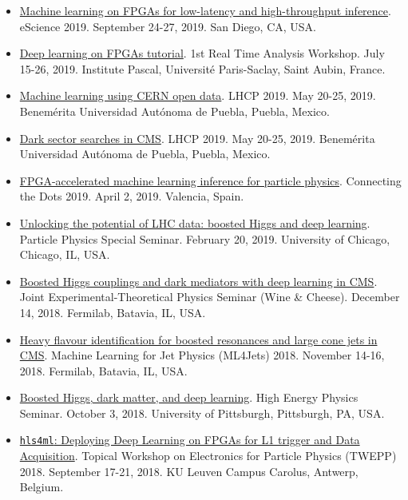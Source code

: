 \documentclass[11pt]{res}
\begin{document}
\begin{resume}
\begin{itemize}
    \item \href{https://escience2019.sdsc.edu/program}{Machine learning on FPGAs for low-latency and high-throughput inference}. eScience 2019. September 24-27, 2019. San Diego, CA, USA.
    \item \href{https://indico.cern.ch/event/793125/contributions/3495251/}{Deep learning on FPGAs tutorial}. 1st Real Time Analysis Workshop. July 15-26, 2019. Institute Pascal, Universit\'{e} Paris-Saclay, Saint Aubin, France.
    \item \href{https://indico.cern.ch/event/687651/contributions/3428206/}{Machine learning using CERN open data}. LHCP 2019. May 20-25, 2019. Benem\'{e}rita Universidad Aut\'{o}noma de Puebla, Puebla, Mexico.
    \item \href{https://indico.cern.ch/event/687651/contributions/3426898/}{Dark sector searches in CMS}. LHCP 2019. May 20-25, 2019. Benem\'{e}rita Universidad Aut\'{o}noma de Puebla, Puebla, Mexico.
    \item \href{https://indico.cern.ch/event/742793/contributions/3274392/}{FPGA-accelerated machine learning inference for particle physics}. Connecting the Dots 2019. April 2, 2019. Valencia, Spain.
    \item \href{https://universityofchicago.hosted.panopto.com/Panopto/Pages/Viewer.aspx?id=66ca09d7-74c1-4b12-bb57-a9fa01046cdf}{Unlocking the potential of LHC data: boosted Higgs and deep learning}. Particle Physics Special Seminar. February 20, 2019. University of Chicago, Chicago, IL, USA.
    \item \href{http://theory.fnal.gov/events/event/results-from-cms-18/}{Boosted Higgs couplings and dark mediators with deep learning in CMS}. Joint Experimental-Theoretical Physics Seminar (Wine \& Cheese). December 14, 2018. Fermilab, Batavia, IL, USA.
    \item \href{https://indico.cern.ch/event/745718/contributions/3211982/}{Heavy flavour identification for boosted resonances and large cone jets in CMS}. Machine Learning for Jet Physics (ML4Jets) 2018. November 14-16, 2018. Fermilab, Batavia, IL, USA.
    \item \href{https://www.physicsandastronomy.pitt.edu/events/hep-seminar-javier-duarte-fermilab}{Boosted Higgs, dark matter, and deep learning}. High Energy Physics Seminar. October 3, 2018. University of Pittsburgh, Pittsburgh, PA, USA.
    \item \href{https://indico.cern.ch/event/697988/contributions/3055990/}{\texttt{hls4ml}: Deploying Deep Learning on FPGAs for L1 trigger and Data Acquisition}. Topical Workshop on Electronics for Particle Physics (TWEPP) 2018. September 17-21, 2018. KU Leuven Campus Carolus, Antwerp, Belgium.

\end{itemize}
\end{resume}
\end{document}

